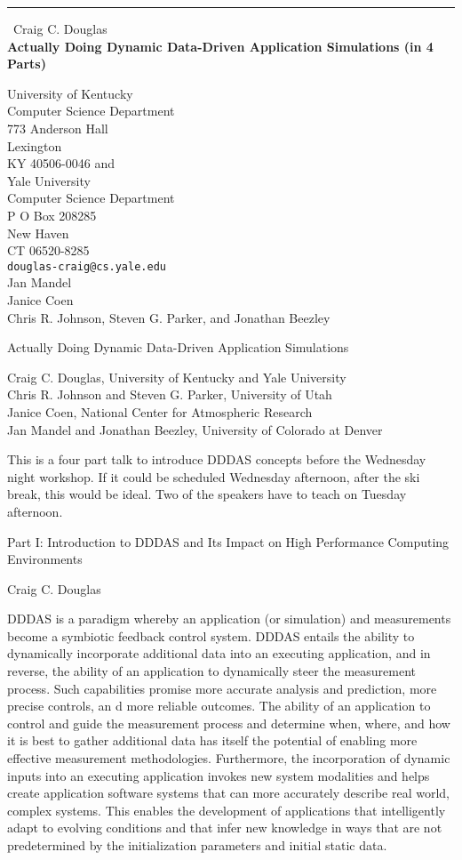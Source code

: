 \documentclass{report}
\begin{document}
\begin{center}
\rule{6in}{1pt} \
{\large Craig C. Douglas \\
{\bf Actually Doing Dynamic Data-Driven Application Simulations (in 4 Parts)}}

University of Kentucky \\ Computer Science Department \\ 773 Anderson Hall \\ Lexington \\ KY 40506-0046 and \\ Yale University \\ Computer Science Department \\ P O Box 208285 \\ New Haven \\ CT 06520-8285
\\
{\tt douglas-craig@cs.yale.edu}\\
Jan Mandel\\
Janice Coen\\
	Chris R. Johnson, Steven G. Parker, and Jonathan Beezley\end{center}

Actually Doing Dynamic Data-Driven Application Simulations

Craig C. Douglas, University of Kentucky and Yale University\\
Chris R. Johnson and Steven G. Parker, University of Utah\\
Janice Coen, National Center for Atmospheric Research\\
Jan Mandel and Jonathan Beezley, University of Colorado at Denver

This is a four part talk to introduce DDDAS concepts before the Wednesday
night workshop. If it could be scheduled Wednesday afternoon, after the
ski break, this would be ideal. Two of the speakers have to teach on
Tuesday afternoon.

Part I: Introduction to DDDAS and Its Impact on High Performance Computing Environments

Craig C. Douglas

DDDAS is a paradigm whereby an application (or simulation) and
measurements become a symbiotic feedback control system. DDDAS entails
the ability to dynamically incorporate additional data into an executing
application, and in reverse, the ability of an application to dynamically
steer the measurement process. Such capabilities promise more accurate
analysis and prediction, more precise controls, an d more reliable
outcomes. The ability of an application to control and guide the
measurement process and determine when, where, and how it is best to
gather additional data has itself the potential of enabling more
effective measurement methodologies. Furthermore, the incorporation of
dynamic inputs into an executing application invokes new system
modalities and helps create application software systems that can more
accurately describe real world, complex systems. This enables the
development of applications that intelligently adapt to evolving
conditions and that infer new knowledge in ways that are not
predetermined by the initialization parameters and initial static data.
\end{document}
